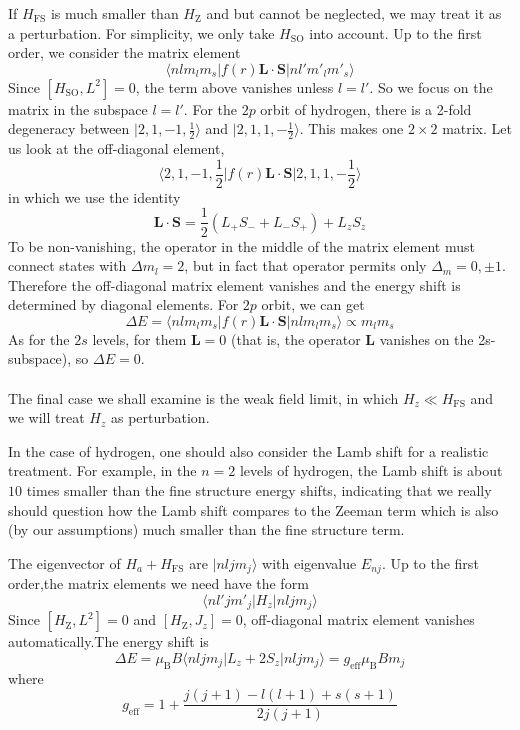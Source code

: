 \documentclass[cyan]{elegantnote}
\begin{document}
If $H_{\mathrm{FS}}$ is much smaller than $H_{\mathrm{Z}}$ and but cannot be neglected, we may treat it as a perturbation. For simplicity, we only take $H_{\mathrm{SO}}$ into account. Up to the first order, we consider the matrix element
\[\langle n l m_l m_s | f(r)\bm{L}\cdot\bm{S}| n l' m'_l m'_s\rangle\]
Since $[H_{\mathrm{SO}},L^2] = 0$, the term above vanishes unless $l = l'$. So we focus on the matrix in the subspace $l = l'$. For the $2p$ orbit of hydrogen, there is a 2-fold degeneracy between $|2,1,-1,\frac{1}{2}\rangle$ and $|2,1,1,-\frac{1}{2}\rangle$.
This makes one $2 \times 2$ matrix. Let us look at the off-diagonal element,
\[\langle 2,1,-1,\frac{1}{2} | f(r)\bm{L}\cdot\bm{S}| 2,1,1,-\frac{1}{2}\rangle\]
in which we use the identity
\[\bm{L}\cdot\bm{S} = \frac{1}{2}(L_+S_-+L_-S_+)+L_zS_z\]
To be non-vanishing, the operator in the middle of the matrix element must connect states with $\Delta m_l = 2$, but in fact that operator permits only $\Delta_m = 0,\pm1$. Therefore the off-diagonal matrix element vanishes and the energy shift is determined by diagonal elements. For $2p$ orbit, we can get
\[\Delta E = \langle n l m_l m_s | f(r)\bm{L}\cdot\bm{S}| n l m_l m_s\rangle \propto m_lm_s\]
As for the $2s$ levels, for them $\bm{L} = 0$ (that is, the operator $\bm{L}$ vanishes on the 2s-subspace), so $\Delta E = 0$.\\ \\
The final case we shall examine is the weak field limit, in which $H_z \ll H_{\mathrm{FS}}$ and we will treat $H_z$ as perturbation.
\begin{note}
In the case of hydrogen, one should also consider the Lamb shift for a realistic treatment. For example, in the $n=2$ levels of hydrogen, the Lamb shift is about $10$ times smaller than the fine structure energy shifts, indicating that we really should question how the Lamb shift compares to the Zeeman term which is also (by our assumptions) much smaller than the fine structure term.
\end{note}
\noindent
The eigenvector of $H_a + H_{\mathrm{FS}}$ are $|nljm_j\rangle$ with eigenvalue $E_{nj}$. Up to the first order,the matrix elements we need have the form
\[\langle n l' j m'_j | H_z | n l j m_j\rangle\]
Since $[H_{\mathrm{Z}},L^2] = 0$ and $[H_{\mathrm{Z}},J_z] = 0$, off-diagonal matrix element vanishes automatically.The energy shift is
\[\Delta E = \mu_{\mathrm{B}} B\langle n l j m_j | L_z + 2S_z | n l j m_j\rangle = g_{\mathrm{eff}} \mu_{\mathrm{B}} B m_j\]
where
\[g_{\mathrm{eff}} = 1 + \frac{j(j+1)-l(l+1)+s(s+1)}{2j(j+1)}\]
\end{document}
